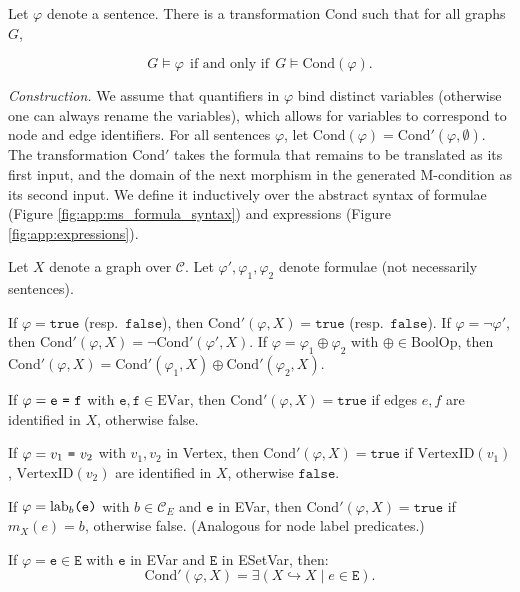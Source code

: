 \documentclass{llncs}
\newcommand{\mt}[1]{\text{\tt{#1}}}
\begin{document}
	\begin{theorem}\label{thm:Cond}\rm
		Let $\varphi$ denote a sentence. There is a transformation Cond such that for all graphs $G$,

	\[ G \models \varphi\ \ \text{if and only if}\ \ G \models \text{Cond}(\varphi). \]

	\noindent \emph{Construction.} We assume that quantifiers in $\varphi$ bind distinct variables (otherwise one can always rename the variables), which allows for variables to correspond to node and edge identifiers. For all sentences $\varphi$, let $\text{Cond}(\varphi) = \text{Cond}'(\varphi,\emptyset)$. The transformation $\text{Cond}'$ takes the formula that remains to be translated as its first input, and the domain of the next morphism in the generated M-condition as its second input. We define it inductively over the abstract syntax of formulae (Figure \ref{fig:app:ms_formula_syntax}) and expressions (Figure \ref{fig:app:expressions}).

	Let $X$ denote a graph over $\mathcal{C}$. Let $\varphi',\varphi_1,\varphi_2$ denote formulae (not necessarily sentences).

	If $\varphi = \mathtt{true}$ (resp.\ $\mathtt{false}$), then $\text{Cond}'(\varphi,X) = \mathtt{true}$ (resp.\ $\mathtt{false}$). If $\varphi = \neg\varphi'$, then $\text{Cond}'(\varphi,X) = \neg \text{Cond}'(\varphi',X)$. If $\varphi = \varphi_1\oplus\varphi_2$ with $\oplus\in\text{BoolOp}$, then $\text{Cond}'(\varphi,X) = \text{Cond}'(\varphi_1,X)\oplus\text{Cond}'(\varphi_2,X)$.
	
	If $\varphi = \mathtt{e}\ \mt{=}\ \mathtt{f}$ with $\mathtt{e},\mathtt{f}\in\text{EVar}$, then $\text{Cond}'(\varphi,X) = \mathtt{true}$ if edges $e,f$ are identified in $X$, otherwise false.

	If $\varphi = v_1\ \mt{=}\ v_2$ with $v_1,v_2$ in Vertex, then $\text{Cond}'(\varphi,X) = \mathtt{true}$ if $\text{VertexID}(v_1)$, $\text{VertexID}(v_2)$ are identified in $X$, otherwise $\mathtt{false}$.
	
	If $\varphi = \text{lab}_b\mt{(}\mathtt{e}\mt{)}$ with $b\in\mathcal{C}_E$ and $\mathtt{e}$ in EVar, then $\text{Cond}'(\varphi,X) = \mathtt{true}$ if $m_X(e) = b$, otherwise false. (Analogous for node label predicates.)

	If $\varphi = \mathtt{e} \in \mathtt{E}$ with $\mathtt{e}$ in EVar and $\mathtt{E}$ in ESetVar, then:
	\[\text{Cond}'(\varphi,X) = \exists (X\hookrightarrow X\mid e \in \mathtt{E}).\]
		

\end{theorem}
\end{document}
